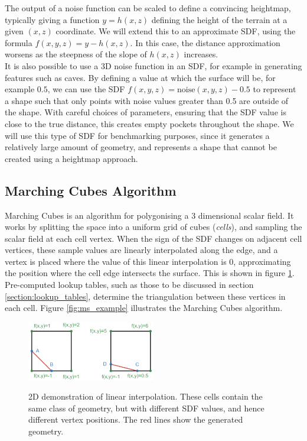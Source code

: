 \documentclass[11pt]{article}
\begin{document}
The output of a noise function can be scaled to define a convincing heightmap, typically giving a function $y = h\left(x,z\right)$ defining the height of the terrain at a given $\left(x,z\right)$ coordinate. We will extend this to an approximate SDF, using the formula $f\left(x,y,z\right) = y - h\left(x,z\right)$. In this case, the distance approximation worsens as the steepness of the slope of $h\left(x,z\right)$ increases.
\\
It is also possible to use a 3D noise function in an SDF, for example in generating features such as caves. By defining a value at which the surface will be, for example $0.5$, we can use the SDF $f\left(x,y,z\right) = \mathrm{noise}\left(x,y,z\right) - 0.5$ to represent a shape such that only points with noise values greater than 0.5 are outside of the shape. With careful choices of parameters, ensuring that the SDF value is close to the true distance, this creates empty pockets throughout the shape. We will use this type of SDF for benchmarking purposes, since it generates a relatively large amount of geometry, and represents a shape that cannot be created using a heightmap approach. 

\subsection{Marching Cubes Algorithm}
\label{section:mc}
Marching Cubes is an algorithm for polygonising a 3 dimensional scalar field. It works by splitting the space into a uniform grid of cubes (\textit{cells}), and sampling the scalar field at each cell vertex. When the sign of the SDF changes on adjacent cell vertices, these sample values are linearly interpolated along the edge, and a vertex is placed where the value of this linear interpolation is 0, approximating the position where the cell edge intersects the surface. This is shown in figure \ref{fig:linear_interpolation}. Pre-computed lookup tables, such as those to be discussed in section \ref{section:lookup_tables}, determine the triangulation between these vertices in each cell. Figure \ref{fig:ms_example} illustrates the Marching Cubes algorithm.

\begin{figure}
  \caption{2D demonstration of linear interpolation. These cells contain the same class of geometry, but with different SDF values, and hence different vertex positions. The red lines show the generated geometry.}
  \includegraphics[width=0.5\textwidth]{linear_interpolation.png}
  \label{fig:linear_interpolation}
\end{figure}
\end{document}
